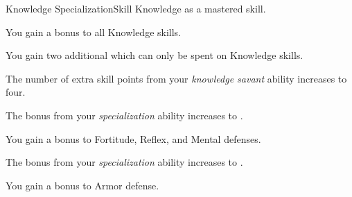     \begin{feat}{Knowledge Specialization}{Skill}
        \featpre Knowledge as a mastered skill.

         You gain a  bonus to all Knowledge skills.

         You gain two additional  which can only be spent on Knowledge skills.

         The number of extra skill points from your \textit{knowledge savant} ability increases to four.

         The bonus from your \textit{specialization} ability increases to .

         You gain a  bonus to Fortitude, Reflex, and Mental defenses. 

         The bonus from your \textit{specialization} ability increases to .

         You gain a  bonus to Armor defense.
    \end{feat}

